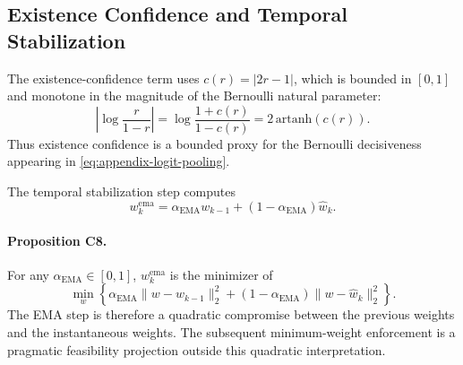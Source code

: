 \subsection{Existence Confidence and Temporal Stabilization}

The existence-confidence term uses $c(r)=|2r-1|$, which is bounded in $[0,1]$ and monotone in the magnitude of the Bernoulli natural parameter:
\begin{equation}
\left|\log\frac{r}{1-r}\right|
=
\log\frac{1+c(r)}{1-c(r)}
=
2\,\mathrm{artanh}(c(r)).
\end{equation}
Thus existence confidence is a bounded proxy for the Bernoulli decisiveness appearing in \eqref{eq:appendix-logit-pooling}.

The temporal stabilization step computes
\begin{equation}
w_k^{\mathrm{ema}} = \alpha_{\mathrm{EMA}} w_{k-1}
+ (1-\alpha_{\mathrm{EMA}})\hat w_k.
\end{equation}

\paragraph{Proposition C8.}
For any $\alpha_{\mathrm{EMA}} \in [0,1]$, $w_k^{\mathrm{ema}}$ is the minimizer of
\begin{equation}
\min_{w}
\left\{
\alpha_{\mathrm{EMA}} \|w-w_{k-1}\|_2^2
+ (1-\alpha_{\mathrm{EMA}})\|w-\hat w_k\|_2^2
\right\}.
\end{equation}
The EMA step is therefore a quadratic compromise between the previous weights and the instantaneous weights. The subsequent minimum-weight enforcement is a pragmatic feasibility projection outside this quadratic interpretation.

